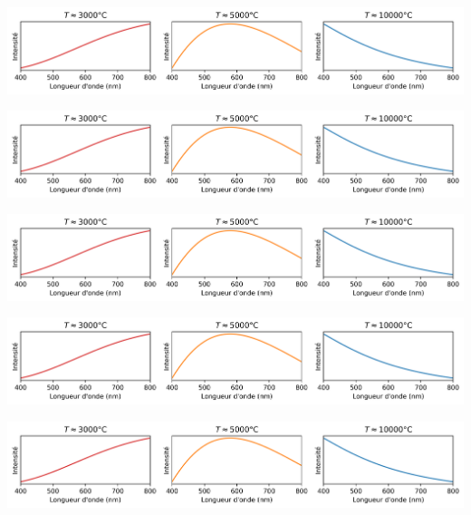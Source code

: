 \documentclass[12pt,a4paper,fleqn]{article}
\begin{document}
\begin{landscape}
\begin{center}
\includegraphics[width=\linewidth]{images/spectrum_black_body_curve10000K.png}
\end{center}

\begin{center}
\includegraphics[width=\linewidth]{images/spectrum_black_body_curve10000K.png}
\end{center}

\begin{center}
\includegraphics[width=\linewidth]{images/spectrum_black_body_curve10000K.png}
\end{center}

\begin{center}
\includegraphics[width=\linewidth]{images/spectrum_black_body_curve10000K.png}
\end{center}

\begin{center}
\includegraphics[width=\linewidth]{images/spectrum_black_body_curve10000K.png}
\end{center}


\end{landscape}
\end{document}
